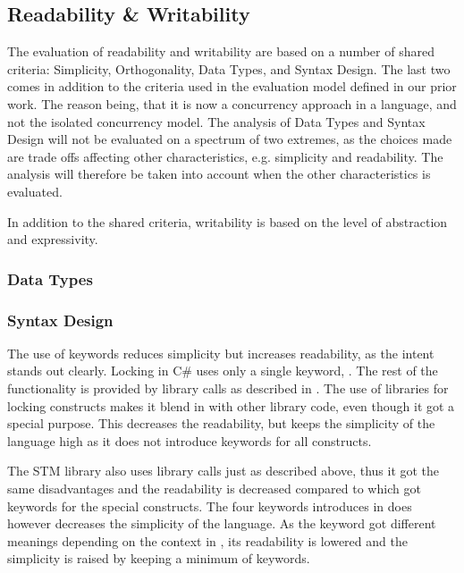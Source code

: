 \subsection{Readability \& Writability}\label{subsec:tl_charac_read_and_write}
The evaluation of readability and writability are based on a number of shared criteria: Simplicity, Orthogonality, Data Types, and Syntax Design. The last two comes in addition to the criteria used in the evaluation model defined in our prior work\cite[p. 16-21]{dpt907e14trending}. The reason being, that it is now a concurrency approach in a language, and not the isolated concurrency model. The analysis of Data Types and Syntax Design will not be evaluated on a spectrum of two extremes, as the choices made are trade offs affecting other characteristics, e.g. simplicity and readability. The analysis will therefore be taken into account when the other characteristics is evaluated.

In addition to the shared criteria, writability is based on the level of abstraction and expressivity.
\subsubsection{Data Types}\label{subsec:datatypes}
% 
\subsubsection{Syntax Design}\label{subsec:syntaxdesign}
The use of keywords reduces simplicity but increases readability, as the intent stands out clearly\cite[p. 12-13]{sebestaProLang}. Locking in C\# uses only a single keyword, . The rest of the functionality is provided by library calls as described in . The use of libraries for locking constructs makes it blend in with other library code, even though it got a special purpose. This decreases the readability, but keeps the simplicity of the language high as it does not introduce keywords for all constructs. 

The \ac{STM} library also uses library calls just as described above, thus it got the same disadvantages and the readability is decreased compared to \stmname which got keywords for the special constructs. The four keywords introduces in \stmname does however decreases the simplicity of the language. As the  keyword got different meanings depending on the context in \stmname, its readability is lowered and the simplicity is raised by keeping a minimum of keywords. 

